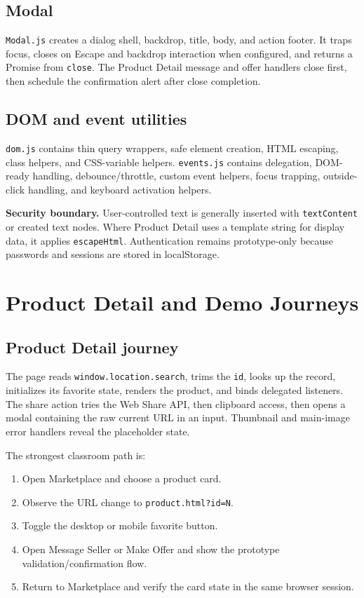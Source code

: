 \documentclass[10pt]{article}
\newcommand{\code}[1]{\texttt{#1}}
\begin{document}
\subsection{Modal}

\code{Modal.js} creates a dialog shell, backdrop, title, body, and action footer. It traps focus, closes on Escape and backdrop interaction when configured, and returns a Promise from \code{close}. The Product Detail message and offer handlers close first, then schedule the confirmation alert after close completion.

\subsection{DOM and event utilities}

\code{dom.js} contains thin query wrappers, safe element creation, HTML escaping, class helpers, and CSS-variable helpers. \code{events.js} contains delegation, DOM-ready handling, debounce/throttle, custom event helpers, focus trapping, outside-click handling, and keyboard activation helpers.

\begin{infobox}
\textbf{Security boundary.} User-controlled text is generally inserted with \code{textContent} or created text nodes. Where Product Detail uses a template string for display data, it applies \code{escapeHtml}. Authentication remains prototype-only because passwords and sessions are stored in localStorage.
\end{infobox}

\section{Product Detail and Demo Journeys}

\subsection{Product Detail journey}

The page reads \code{window.location.search}, trims the \code{id}, looks up the record, initializes its favorite state, renders the product, and binds delegated listeners. The share action tries the Web Share API, then clipboard access, then opens a modal containing the raw current URL in an input. Thumbnail and main-image error handlers reveal the placeholder state.

The strongest classroom path is:

\begin{enumerate}
  \setlength{\itemsep}{1pt}
  \item Open Marketplace and choose a product card.
  \item Observe the URL change to \code{product.html?id=N}.
  \item Toggle the desktop or mobile favorite button.
  \item Open Message Seller or Make Offer and show the prototype validation/confirmation flow.
  \item Return to Marketplace and verify the card state in the same browser session.
\end{enumerate}
\end{document}
